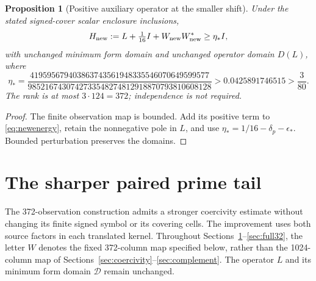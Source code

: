 \documentclass[11pt,a4paper]{article}
\numberwithin{equation}{section}
\newtheorem{proposition}[theorem]{Proposition}
\theoremstyle{definition}\newtheorem{definition}[theorem]{Definition}
\theoremstyle{remark}\newtheorem{remark}[theorem]{Remark}
\newcommand{\DD}{\mathcal D}
\begin{document}
\begin{proposition}[Positive auxiliary operator at the smaller shift]\label{prop:new}
Under the stated signed-cover scalar enclosure inclusions,
\begin{equation}\label{eq:newH}
 H_{\rm new}:=L+\tfrac1{16}I+W_{\rm new}W_{\rm new}^*
 \ge\eta_*I,
\end{equation}
with unchanged minimum form domain and unchanged operator domain $D(L)$, where
\begin{equation}\label{eq:etastar}
 \eta_*=\frac{419595679403863743561948335546070649599577}
 {9852167430742733548274812918870793810608128}
 >0.0425891746515>\frac3{80}.
\end{equation}
The rank is at most $3\cdot124=372$; independence is not required.
\end{proposition}
\begin{proof}
The finite observation map is bounded. Add its positive term to \eqref{eq:newenergy}, retain the nonnegative pole in $L$, and use
$\eta_*=1/16-\delta_p-\epsilon_*$. Bounded perturbation preserves the domains.
\end{proof}

\section{The sharper paired prime tail}\label{sec:sharp32}
The 372-observation construction admits a stronger coercivity estimate without changing its finite signed symbol or its covering cells. The improvement uses both source factors in each translated kernel. Throughout Sections~\ref{sec:sharp32}--\ref{sec:full32}, the letter $W$ denotes the fixed 372-column map specified below, rather than the 1024-column map of Sections~\ref{sec:coercivity}--\ref{sec:complement}. The operator $L$ and its minimum form domain $\DD$ remain unchanged.
\end{document}
